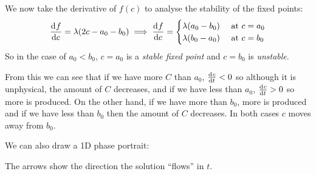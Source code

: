 \documentclass[../main.tex]{subfiles}
\begin{document}
\begin{example}
  We now take the derivative of $f(c)$ to analyse the stability of the fixed points:
  \[
    \deriv{f}{c} = \lambda (2c - a_0 -b_0) \implies \deriv{f}{c} = \begin{cases}
    \lambda(a_0 - b_0) & \text{ at }c=a_0 \\
    \lambda(b_0 - a_0) & \text{ at }c=b_0
    \end{cases}
  \]
  So in the case of $a_0 < b_0$, $c = a_0$ is a \textit{stable fixed point} and $c = b_0$ is \textit{unstable}.
  \begin{center}
  \end{center}
  From this we can see that if we have more $C$ than $a_0$, $\deriv{c}{t} < 0$ so although it is unphysical, the amount of $C$ decreases, and if we have less than $a_0$, $\deriv{c}{t} > 0$ so more is produced.
  On the other hand, if we have more than $b_0$, more is produced and if we have less than $b_0$ then the amount of $C$ decreases.
  In both cases $c$ moves away from $b_0$.

  We can also draw a 1D phase portrait:
  \begin{center}
  \end{center}
  The arrows show the direction the solution ``flows'' in $t$.
\end{example}
\end{document}

